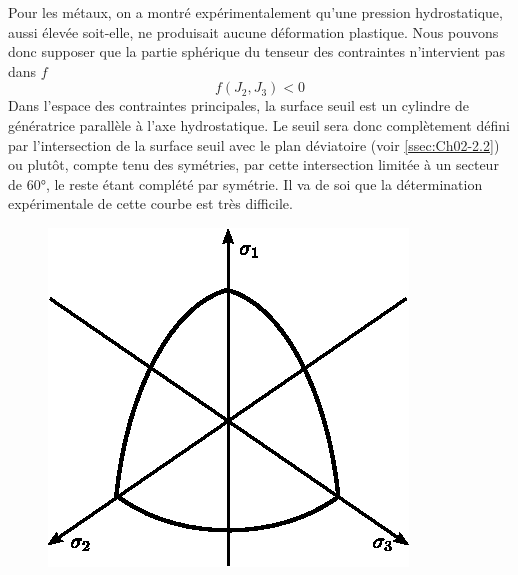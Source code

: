 Pour les métaux, on a montré expérimentalement qu'une pression hydrostatique, aussi élevée soit-elle, ne produisait aucune déformation plastique.
Nous pouvons donc supposer que la partie sphérique du tenseur des contraintes n'intervient pas dans $f$
\begin{equation}
    f \left( J_2, J_3 \right) < 0
    \label{eq:Ch05-061}
\end{equation}
Dans l'espace des contraintes principales, la surface seuil est un cylindre de génératrice parallèle à l'axe hydrostatique.
Le seuil sera donc complètement défini par l'intersection de la surface seuil avec le plan déviatoire (voir \ref{ssec:Ch02-2.2}) ou plutôt, compte tenu des symétries, par cette intersection limitée à un secteur de 60°, le reste étant complété par symétrie.
Il va de soi que la détermination expérimentale de cette courbe est très difficile.
\begin{figure}
    \begin{center}
        \includegraphics{../images/T1_Ch05-02}
    \end{center}
\end{figure}

